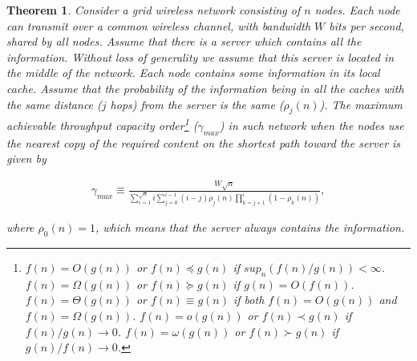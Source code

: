 \documentclass[journal]{IEEEtran}
\theoremstyle{plain}
\newtheorem{theorem}{Theorem}
\theoremstyle{remark}
\begin{document}
\begin{theorem} \label{thm:01}
Consider a grid wireless network consisting of $n$ nodes. Each node can transmit over a common wireless channel, with bandwidth $W$ bits per second, shared by all nodes. Assume that there is a server which contains all the information. Without loss of generality we assume that this server is located in the middle of the network. Each node contains some information in its local cache. Assume that the probability of the information being in all the caches with the same distance ($j$ hops) from the server is the same ($\rho_j(n)$). The maximum achievable throughput capacity order\footnote{$f(n)=O(g(n))$ or $f(n)\preceq g(n)$ if $sup_n(f(n)/g(n))<\infty$. $f(n)=\Omega(g(n))$ or $f(n) \succeq g(n)$ if $g(n)=O(f(n))$. $f(n)=\Theta(g(n))$ or $f(n)\equiv g(n)$ if both $f(n)=O(g(n))$ and $f(n)=\Omega(g(n))$. $f(n)=o(g(n))$ or $f(n) \prec g(n)$ if $f(n)/g(n)\rightarrow 0$. $f(n)=\omega(g(n))$ or $f(n) \succ g(n)$ if $g(n)/f(n)\rightarrow 0$.} ($\gamma_{max}$) in such network when the nodes use the nearest copy of the required content on the shortest path toward the server is given by

\begin{eqnarray}
			\gamma_{max}\equiv \frac{W\sqrt{n}}{\sum_{i=1}^{\sqrt{n}} i \sum_{j=0}^{i-1} (i-j)\rho_j(n)\prod_{k=j+1}^i(1-\rho_k(n))}, \nonumber
\end{eqnarray}
	
where $\rho_0(n)=1$, which means that the server always contains the information.

\end{theorem}
\end{document}
